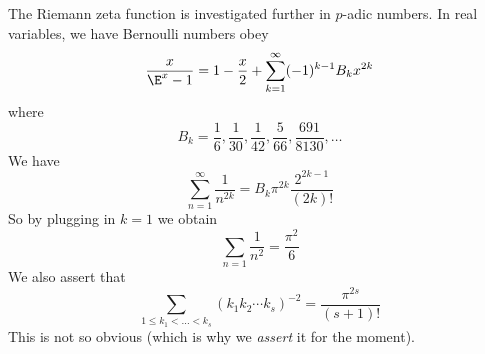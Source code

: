 The Riemann zeta function is investigated further in $p$-adic
numbers. In real variables, we have Bernoulli numbers obey
\begin{equation}
\frac{x}{\E^{x}-1}=1-\frac{x}{2}+\sum^{\infty}_{k=1}(-1)^{k-1}B_{k}x^{2k}
\end{equation}
where
\begin{equation}
B_{k}=\frac{1}{6},\frac{1}{30},\frac{1}{42},\frac{5}{66},\frac{691}{8130},\dots
\end{equation}
We have
\begin{equation}
\sum^{\infty}_{n=1}\frac{1}{n^{2k}}=B_{k}\pi^{2k}\frac{2^{2k-1}}{(2k)!}
\end{equation}
So by plugging in $k=1$ we obtain
\begin{equation}
\sum_{n=1}\frac{1}{n^{2}}=\frac{\pi^{2}}{6}
\end{equation}
We also assert that
\begin{equation}
\sum_{1\leq k_{1}<\dots<k_{s}}(k_{1}k_{2}\cdots k_{s})^{-2}=\frac{\pi^{2s}}{(s+1)!}
\end{equation}
This is not so obvious (which is why we \emph{assert} it for the
moment). 

